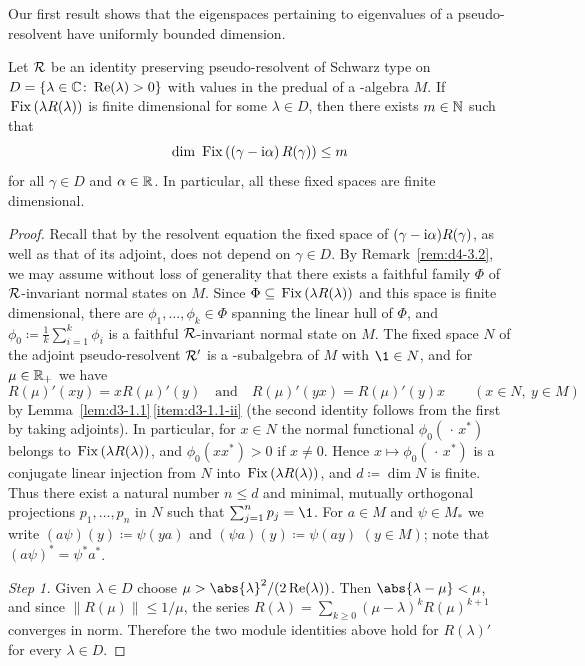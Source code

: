 Our first result shows that the eigenspaces pertaining to eigenvalues of a pseudo-resolvent have uniformly bounded dimension.
\begin{proposition}\label{prop:d3-2.1}
Let $\mathcal{R}$ be an identity preserving pseudo-resolvent of Schwarz type on $D = \{\lambda \in \mathbb{C} \colon \mathop{}\!\mathrm{Re}(\lambda) > 0\}$ with values in the predual of a \WA-algebra $M$. 
If\/ $\mathop{}\mathrm{Fix}\left(\lambda R(\lambda)\right)$ is finite dimensional for some $\lambda \in D$, then there exists $m \in \mathbb{N}$ such that
\[
\dim \Fix{\left( \gamma - \im\alpha \right)R(\gamma)} \leq m
\]
for all $\gamma \in D$ and $\alpha \in \mathbb{R}$.
In particular, all these fixed spaces are finite dimensional.
\end{proposition}
\begin{proof}
Recall that by the resolvent equation the fixed space of\/ $(\gamma - \mathrm{i}\alpha)R(\gamma)$, as well as that of its adjoint, does not depend on $\gamma \in D$.
By Remark~\ref{rem:d4-3.2}, we may assume without loss of generality that there exists a faithful family $\Phi$ of\/ $\mathcal{R}$-invariant normal states on $M$.
Since $\Phi \subseteq \mathop{}\mathrm{Fix}\left(\lambda R(\lambda)\right)$ and this space is finite dimensional, there are $\phi_{1}, \ldots, \phi_{k} \in \Phi$ spanning the linear hull of\/ $\Phi$, and $\phi_{0} \coloneq \frac{1}{k}\sum_{i=1}^{k}\phi_{i}$ is a faithful $\mathcal{R}$-invariant normal state on $M$.
The fixed space $N$ of the adjoint pseudo-resolvent $\mathcal{R}'$ is a \WA-subalgebra of\/ $M$ with $\1 \in N$, and for $\mu \in \mathbb{R}_{+}$ we have
\[
	R(\mu)'(xy) = xR(\mu)'(y)
	\quad \text{and} \quad 
	R(\mu)'(yx) = R(\mu)'(y)x \qquad (x \in N,\ y \in M)
\]
by Lemma~\ref{lem:d3-1.1}\,\ref{item:d3-1.1-ii} (the second identity follows from the first by taking adjoints).
In particular, for $x \in N$ the normal functional $\phi_{0}(\,\cdot\,x^{*})$ belongs to $\mathop{}\mathrm{Fix}\left(\lambda R(\lambda)\right)$, and $\phi_{0}(xx^{*}) > 0$ if\/ $x \neq 0$.
Hence $x \mapsto \phi_{0}(\,\cdot\,x^{*})$ is a conjugate linear injection from $N$ into $\mathop{}\mathrm{Fix}\left(\lambda R(\lambda)\right)$, and $d \coloneq \dim N$ is finite.
Thus there exist a natural number $n \leq d$ and minimal, mutually orthogonal projections $p_{1}, \ldots, p_{n}$ in $N$ such that $\sum_{j=1}^{n} p_{j} = \1$.
For $a \in M$ and $\psi \in M_{*}$ we write $(a\psi)(y) \coloneq \psi(ya)$ and $(\psi a)(y) \coloneq \psi(ay)$ $(y \in M)$; note that $(a\psi)^{*} = \psi^{*}a^{*}$.

\emph{Step 1.}
Given $\lambda \in D$ choose $\mu > \abs{\lambda}^{2}/(2\Re(\lambda))$.
Then $\abs{\lambda - \mu} < \mu$, and since $\|R(\mu)\| \leq 1/\mu$, the series $R(\lambda) = \sum_{k \geq 0} (\mu - \lambda)^{k}R(\mu)^{k+1}$ converges in norm.
Therefore the two module identities above hold for $R(\lambda)'$ for every $\lambda \in D$.


\end{proof}
